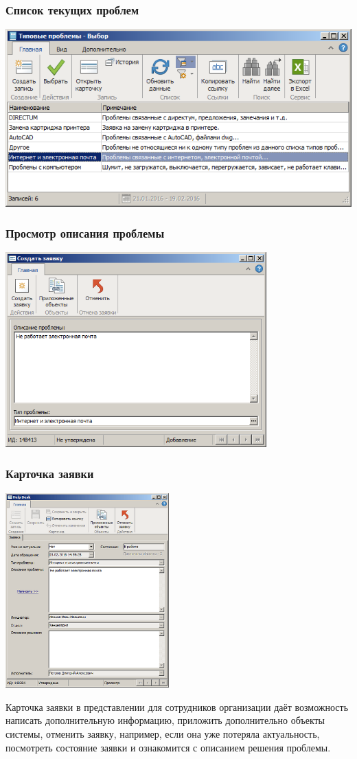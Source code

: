 \documentclass{../industrial-development}
\begin{document}
\begin{frame} \frametitle{Список текущих проблем}
\centerline{\includegraphics[width=\textwidth]{pic2.png}}
\end{frame}
\lecturenotes

\begin{frame} \frametitle{Просмотр описания проблемы}
\centerline{\includegraphics[height=7.5cm]{pic3.png}}
\end{frame}
\lecturenotes

\begin{frame} \frametitle{Карточка заявки}
\centerline{\includegraphics[height=7.5cm]{pic4.png}}
\end{frame}
\lecturenotes
Карточка заявки в представлении для сотрудников организации даёт возможность написать дополнительную информацию, приложить дополнительно объекты системы, отменить заявку, например, если она уже потеряла актуальность, посмотреть состояние заявки и ознакомится с описанием решения проблемы.
\end{document}
